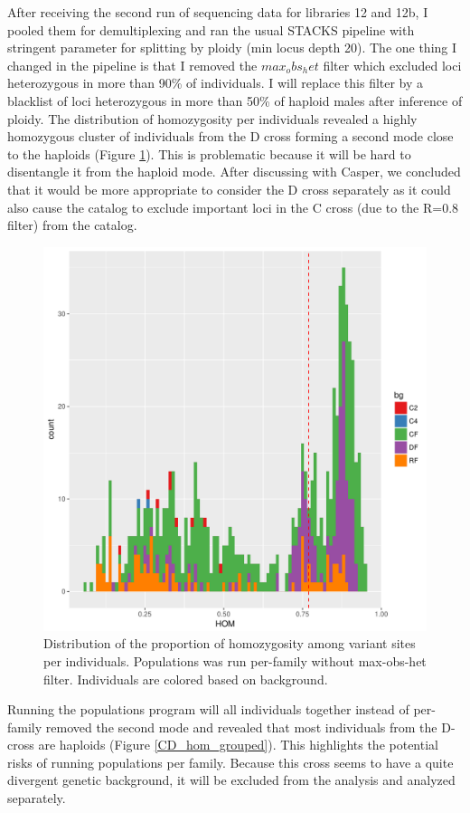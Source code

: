 \documentclass[10pt,a4paper]{report}
\begin{document}
After receiving the second run of sequencing data for libraries 12 and 12b, I pooled them for demultiplexing and ran the usual STACKS pipeline with stringent parameter for splitting by ploidy (min locus depth 20). The one thing I changed in the pipeline is that I removed the $max_obs_het$ filter which excluded loci heterozygous in more than 90\% of individuals. I will replace this filter by a blacklist of loci heterozygous in more than 50\% of haploid males after inference of ploidy. The distribution of homozygosity per individuals revealed a highly homozygous cluster of individuals from the D cross forming a second mode close to the haploids (Figure \ref{CD_hom_fam}). This is problematic because it will be hard to disentangle it from the haploid mode. After discussing with Casper, we concluded that it would be more appropriate to consider the D cross separately as it could also cause the catalog to exclude important loci in the C cross (due to the R=0.8 filter) from the catalog.

\begin{figure}
\begin{center}
\includegraphics[width=\textwidth]{final_samples/hom_bg_popfam_d20_CD.pdf}
\caption{Distribution of the proportion of homozygosity among variant sites per individuals. Populations was run per-family without max-obs-het filter. Individuals are colored based on background.}
\label{CD_hom_fam}
\end{center}
\end{figure}
Running the populations program will all individuals together instead of per-family removed the second mode and revealed that most individuals from the D-cross are haploids (Figure \ref{CD_hom_grouped}). This highlights the potential risks of running populations per family. Because this cross seems to have a quite divergent genetic background, it will be excluded from the analysis and analyzed separately.
\end{document}
